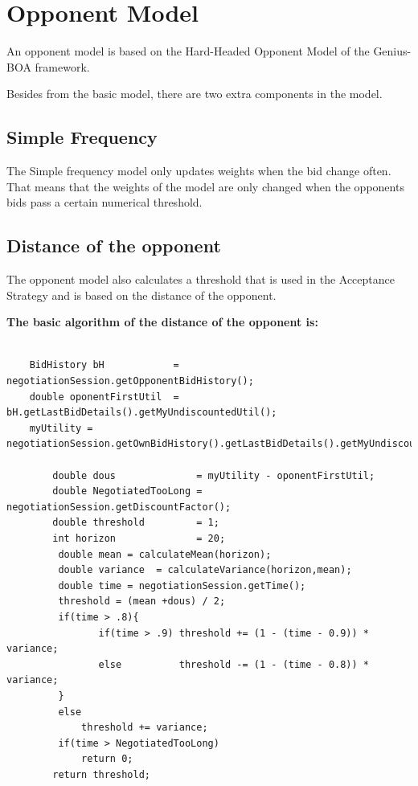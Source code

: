 \documentclass[html]{report}    %
\begin{document}
\section{Opponent Model}  

An opponent model is based on the Hard-Headed Opponent Model of the Genius-BOA framework.

Besides from the basic model, there are two extra components in the model.~\cite{anac2013}

\subsection{Simple Frequency}

The Simple frequency model only updates weights when the bid change often.
That means that the weights of the model are only changed when the opponents bids pass a certain numerical threshold.

\subsection{Distance of the opponent}

The opponent model also calculates a threshold that is used in the Acceptance Strategy and is based on the distance of the opponent.

\textbf{ The basic algorithm of the distance of the opponent is:}

\begin{verbatim}

	BidHistory bH            = negotiationSession.getOpponentBidHistory();
	double oponentFirstUtil  = bH.getLastBidDetails().getMyUndiscountedUtil();
    myUtility = negotiationSession.getOwnBidHistory().getLastBidDetails().getMyUndiscountedUtil();
	    
	    double dous              = myUtility - oponentFirstUtil; 
	    double NegotiatedTooLong = negotiationSession.getDiscountFactor();
	    double threshold         = 1;    
	    int horizon              = 20;    
	     double mean = calculateMean(horizon);
	     double variance  = calculateVariance(horizon,mean);
	     double time = negotiationSession.getTime();
	     threshold = (mean +dous) / 2;
	     if(time > .8){
	        	if(time > .9) threshold += (1 - (time - 0.9)) * variance;
	        	else          threshold -= (1 - (time - 0.8)) * variance;
	     }
	     else
	         threshold += variance;
	     if(time > NegotiatedTooLong)
	         return 0;
	    return threshold;
\end{verbatim}
\end{document}
